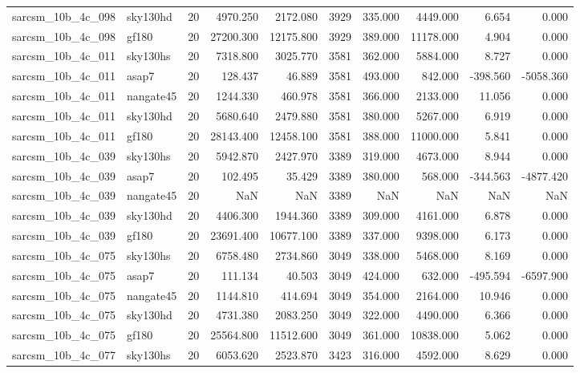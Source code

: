 \begin{longtable}{llrrrrrrrr}
sarcsm\_10b\_4c\_098 & sky130hd & 20 & 4970.250 & 2172.080 & 3929 & 335.000 & 4449.000 & 6.654 & 0.000 \\
sarcsm\_10b\_4c\_098 & gf180 & 20 & 27200.300 & 12175.800 & 3929 & 389.000 & 11178.000 & 4.904 & 0.000 \\
sarcsm\_10b\_4c\_011 & sky130hs & 20 & 7318.800 & 3025.770 & 3581 & 362.000 & 5884.000 & 8.727 & 0.000 \\
sarcsm\_10b\_4c\_011 & asap7 & 20 & 128.437 & 46.889 & 3581 & 493.000 & 842.000 & -398.560 & -5058.360 \\
sarcsm\_10b\_4c\_011 & nangate45 & 20 & 1244.330 & 460.978 & 3581 & 366.000 & 2133.000 & 11.056 & 0.000 \\
sarcsm\_10b\_4c\_011 & sky130hd & 20 & 5680.640 & 2479.880 & 3581 & 380.000 & 5267.000 & 6.919 & 0.000 \\
sarcsm\_10b\_4c\_011 & gf180 & 20 & 28143.400 & 12458.100 & 3581 & 388.000 & 11000.000 & 5.841 & 0.000 \\
sarcsm\_10b\_4c\_039 & sky130hs & 20 & 5942.870 & 2427.970 & 3389 & 319.000 & 4673.000 & 8.944 & 0.000 \\
sarcsm\_10b\_4c\_039 & asap7 & 20 & 102.495 & 35.429 & 3389 & 380.000 & 568.000 & -344.563 & -4877.420 \\
sarcsm\_10b\_4c\_039 & nangate45 & 20 & NaN & NaN & 3389 & NaN & NaN & NaN & NaN \\
sarcsm\_10b\_4c\_039 & sky130hd & 20 & 4406.300 & 1944.360 & 3389 & 309.000 & 4161.000 & 6.878 & 0.000 \\
sarcsm\_10b\_4c\_039 & gf180 & 20 & 23691.400 & 10677.100 & 3389 & 337.000 & 9398.000 & 6.173 & 0.000 \\
sarcsm\_10b\_4c\_075 & sky130hs & 20 & 6758.480 & 2734.860 & 3049 & 338.000 & 5468.000 & 8.169 & 0.000 \\
sarcsm\_10b\_4c\_075 & asap7 & 20 & 111.134 & 40.503 & 3049 & 424.000 & 632.000 & -495.594 & -6597.900 \\
sarcsm\_10b\_4c\_075 & nangate45 & 20 & 1144.810 & 414.694 & 3049 & 354.000 & 2164.000 & 10.946 & 0.000 \\
sarcsm\_10b\_4c\_075 & sky130hd & 20 & 4731.380 & 2083.250 & 3049 & 322.000 & 4490.000 & 6.366 & 0.000 \\
sarcsm\_10b\_4c\_075 & gf180 & 20 & 25564.800 & 11512.600 & 3049 & 361.000 & 10838.000 & 5.062 & 0.000 \\
sarcsm\_10b\_4c\_077 & sky130hs & 20 & 6053.620 & 2523.870 & 3423 & 316.000 & 4592.000 & 8.629 & 0.000 \\

\end{longtable}
